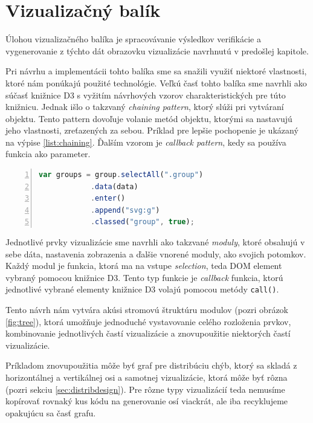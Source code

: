 \section{Vizualizačný balík}
Úlohou vizualizačného balíka je spracovávanie výsledkov verifikácie a vygenerovanie z týchto dát obrazovku vizualizácie navrhnutú v predošlej kapitole. 

Pri návrhu a implementácii tohto balíka sme sa snažili využiť niektoré vlastnosti, ktoré nám ponúkajú použité technológie. Veľkú časť tohto balíka sme navrhli ako súčasť knižnice D3 s vyžitím návrhových vzorov charakteristických pre túto knižnicu. Jednak išlo o takzvaný \textit{chaining pattern}, ktorý slúži pri vytváraní objektu. Tento pattern dovoľuje volanie metód objektu, ktorými sa nastavujú jeho vlastnosti, zreťazených za sebou. Príklad pre lepšie pochopenie je ukázaný na výpise \ref{list:chaining}.
Ďalším vzorom je \textit{callback pattern}, kedy sa používa funkcia ako parameter. 


\begin{lstlisting}[frame=solid, backgroundcolor=\color{bg}, basicstyle=\footnotesize\ttfamily, language=JavaScript, numbers=left, numberstyle=\tiny\color{black}, caption=Ukážka aplikácie návrhového vzoru \textit{chainning}., captionpos=b, label=list:chaining]
var groups = group.selectAll(".group")
		    .data(data)
		    .enter()
		    .append("svg:g")
		    .classed("group", true);	
\end{lstlisting}

Jednotlivé prvky vizualizácie sme navrhli ako takzvané \textit{moduly}, ktoré obsahujú v sebe dáta, nastavenia zobrazenia a ďalšie vnorené moduly, ako svojich potomkov. Každý modul je funkcia, ktorá ma na vstupe \textit{selection}, teda DOM element vybraný pomocou knižnice D3. Tento typ funkcie je \textit{callback} funkcia, ktorú jednotlivé vybrané elementy knižnice D3 volajú pomocou metódy \texttt{call()}. 

Tento návrh nám vytvára akúsi stromovú štruktúru modulov (pozri obrázok \ref{fig:tree}), ktorá umožňuje jednoduché vystavovanie celého rozloženia prvkov, kombinovanie jednotlivých častí vizualizácie a znovupoužitie niektorých častí vizualizácie. 

Príkladom znovupoužitia môže byť graf pre distribúciu chýb, ktorý sa skladá z horizontálnej a vertikálnej osi a samotnej vizualizácie, ktorá môže byť rôzna (pozri sekciu \ref{sec:distribdesign}). Pre rôzne typy vizualizácií teda nemusíme kopírovať rovnaký kus kódu na generovanie osí viackrát, ale iba recyklujeme opakujúcu sa časť grafu.   

